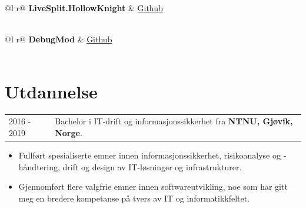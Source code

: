 \documentclass[a4paper,12pt]{article}
\begin{document}
\begin{tabularx}{\linewidth}{ @{}l r@{} }
\textbf{LiveSplit.HollowKnight} & \hfill \href{https://github.com/ShootMe/LiveSplit.HollowKnight/tree/master}{Github} \\[3.75pt]
  \\
\end{tabularx}

\begin{tabularx}{\linewidth}{ @{}l r@{} }
\textbf{DebugMod} & \hfill \href{https://github.com/cerpintext/DebugMod}{Github} \\[3.75pt]
  \\
\end{tabularx}


\newpage

\section{Utdannelse}
\begin{tabularx}{\linewidth}{@{}l X@{}}	

2016 - 2019 & Bachelor i IT-drift og informasjonssikkerhet fra \textbf{NTNU, Gjøvik, Norge}. \\
\end{tabularx}
\begin{itemize}
    \item Fullført spesialiserte emner innen informasjonssikkerhet, risikoanalyse og -håndtering, drift og design av IT-løsninger og infrastrukturer. 
    \item Gjennomført flere valgfrie emner innen softwareutvikling, noe som har gitt meg en bredere kompetanse på tvers av IT og informatikkfeltet. 
\end{itemize}

\end{document}
